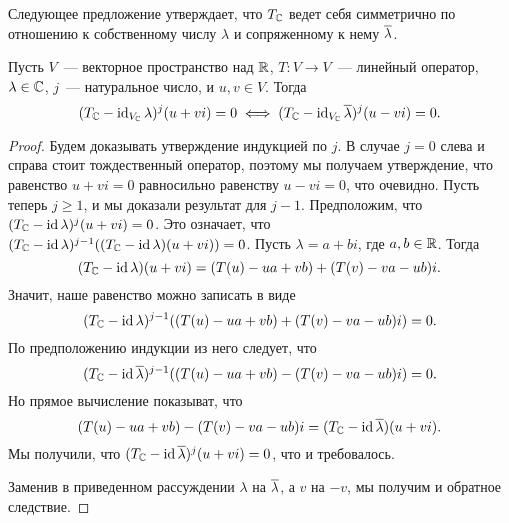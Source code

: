 Следующее предложение утверждает, что $T_\mathbb C$ ведет себя симметрично
по отношению к собственному числу $\lambda$ и сопряженному к нему
$\overline\lambda$.
\begin{proposition}\label{prop:conjugation-of-eigenvalue}
Пусть $V$~--- векторное пространство над $\mathbb R$, $T\colon V\to V$~--- линейный
оператор, $\lambda\in\mathbb C$, $j$~--- натуральное число, и $u,v\in V$.
Тогда
$$
(T_\mathbb C-\operatorname{id}_{V_\mathbb C}\lambda)^j(u+vi) = 0\;\Longleftrightarrow\;
(T_\mathbb C-\operatorname{id}_{V_\mathbb C}\overline\lambda)^j(u-vi) = 0.
$$
\end{proposition}
\begin{proof}
Будем доказывать утверждение индукцией по $j$. В случае $j=0$ слева и справа
стоит тождественный оператор, поэтому мы получаем утверждение,
что равенство $u+vi=0$ равносильно равенству $u-vi = 0$, что очевидно.
Пусть теперь $j\geq 1$, и мы доказали результат для $j-1$.
Предположим, что $(T_\mathbb C-\operatorname{id}\lambda)^j(u+vi) = 0$.
Это означает, что $(T_\mathbb C-\operatorname{id}\lambda)^{j-1}((T_\mathbb C-\operatorname{id}\lambda)(u+vi)) = 0$.
Пусть $\lambda=a+bi$, где $a,b\in\mathbb R$. Тогда
$$
(T_\mathbb C-\operatorname{id}\lambda)(u+vi) = (T(u)-ua+vb) + (T(v)-va-ub)i.
$$
Значит, наше равенство можно записать в виде
$$
(T_\mathbb C-\operatorname{id}\lambda)^{j-1}((T(u)-ua+vb) + (T(v)-va-ub)i) = 0.
$$
По предположению индукции из него следует, что
$$
(T_\mathbb C-\operatorname{id}\overline\lambda)^{j-1}((T(u)-ua+vb) - (T(v)-va-ub)i) = 0.
$$
Но прямое вычисление показыват, что 
$$
(T(u)-ua+vb) - (T(v)-va-ub)i = (T_\mathbb C-\operatorname{id}\overline\lambda)(u+vi).
$$
Мы получили, что $(T_\mathbb C-\operatorname{id}\overline\lambda)^{j}(u+vi) = 0$, что и требовалось.

Заменив в приведенном рассуждении
$\lambda$ на $\overline\lambda$, а $v$ на $-v$, мы получим
и обратное следствие.
\end{proof}

